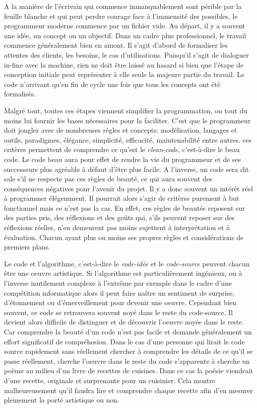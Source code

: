 \documentclass[12pt]{article} %
\begin{document}
A la manière de l'écrivain qui commence inmanquablement sont périble par la feuille blanche et qui peut perdre courage face à l'immensité des possibles, le programmeur moderne commence par un fichier vide. Au départ, il y a souvent une idée, un concept ou un objectif. Dans un cadre plus professionnel, le travail commence généralement bien en amont. Il s'agit d'abord de formaliser les attentes des clients, les besoins, le cas d'utilisations. Puisqu'il s'agit de dialoguer in-fine avec la machine, rien ne doit être laissé au hasard si bien que l'étape de conception initiale peut représenter à elle seule la majeure partie du travail. Le code n'arrivant qu'en fin de cycle une fois que tous les concepts ont été formalisés. 

Malgré tout, toutes ces étapes viennent simplifier la programmation, ou tout du moins lui fournir les bases nécessaires pour la faciliter. C'est que le programmeur doit jongler avec de nombreuses règles et concepts: modélisation, langages et outils, paradigmes, élégance, simplicité, efficacité, maintenabilité entre autres. ces critères permettent de comprendre ce qu'est le \textit{clean-code}, c'est-à-dire le beau code. Le code beau aura pour effet de rendre la vie du programmeur et de ses successeurs plus agréable à défaut d'être plus facile. A l'inverse, un code sera dit sale s'il ne respecte pas ces règles de beauté, ce qui aura souvent des conséquences négatives pour l'avenir du projet. Il y a donc souvent un intérêt réel à programmer élégemment. Il pourrait alors s'agir de critères purement à but fonctionnel mais ce n'est pas la cas. En effet, ces règles de beautés reposent sur des parties pris, des réflexions et des goûts qui, s'ils peuvent reposer sur des réflexions réelles, n'en demeurent pas moins sujettent à interprétation et à évaluation. Chacun ayant plus ou moins ses propres règles et considérations de premiers plans. 

Le code et l'algorithme, c'est-à-dire le \textit{code-idée} et le \textit{code-source} peuvent chacun être une oeuvre artistique. Si l'algorithme est particulièrement ingénieux, ou à l'inverse inutilement complexe à l'extrême par exemple dans le cadre d'une compétition informatique alors il peut faire naître un sentiment de surprise, d'étonnement ou d'émerveillement pour devenir une oeuvre. Cependant bien souvent, ce code se retrouvera souvent noyé dans le reste du code-source. Il devient alors difficile de distinguer et de découvrir l'oeuvre noyée dans le reste. Car comprendre la beauté d'un code n'est pas facile et demande généralement un effort significatif de compréhesion. Dans le cas d'une personne qui lirait le code source rapidement sans réellement chercher à comprendre les détails de ce qu'il se passe réellement, cherche l'oeuvre dans le reste du code s'apparente à cherche un poème au milieu d'un livre de recettes de cuisines. Dans ce cas la poésie viendrait d'une recette, originale et surprenante pour un cuisinier. Cela montre malheureusement qu'il faudra lire et comprendre chaque recette afin d'en mesurer pleinement la porté artistique ou non.
\end{document}
